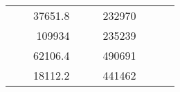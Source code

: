 \begin{table}[H]
\begin{tabular}{|ccrccrccc}
\multicolumn{1}{|c|}{\cellcolor[HTML]{FFFFC7}}                                & \multicolumn{1}{c|}{\cellcolor[HTML]{DAE8FC}}                      & \multicolumn{1}{r|}{\cellcolor[HTML]{DAE8FC}37651.8}   & \multicolumn{1}{c|}{\cellcolor[HTML]{FFFFC7}}                                & \multicolumn{1}{c|}{\cellcolor[HTML]{DAE8FC}}                       & \multicolumn{1}{r|}{\cellcolor[HTML]{DDFDFF}232970}    &                                                                              &                                                                    &                                                        \\ \cline{3-3} \cline{6-6}
\multicolumn{1}{|c|}{\cellcolor[HTML]{FFFFC7}}                                & \multicolumn{1}{c|}{\cellcolor[HTML]{DAE8FC}}                      & \multicolumn{1}{r|}{\cellcolor[HTML]{DDFDFF}109934}    & \multicolumn{1}{c|}{\cellcolor[HTML]{FFFFC7}}                                & \multicolumn{1}{c|}{\cellcolor[HTML]{DAE8FC}}                       & \multicolumn{1}{r|}{\cellcolor[HTML]{DAE8FC}235239}    &                                                                              &                                                                    &                                                        \\ \cline{3-3} \cline{6-6}
\multicolumn{1}{|c|}{\cellcolor[HTML]{FFFFC7}}                                & \multicolumn{1}{c|}{\cellcolor[HTML]{DAE8FC}}                      & \multicolumn{1}{r|}{\cellcolor[HTML]{DAE8FC}62106.4}   & \multicolumn{1}{c|}{\cellcolor[HTML]{FFFFC7}}                                & \multicolumn{1}{c|}{\cellcolor[HTML]{DAE8FC}}                       & \multicolumn{1}{r|}{\cellcolor[HTML]{DDFDFF}490691}    &                                                                              &                                                                    &                                                        \\ \cline{3-3} \cline{6-6}
\multicolumn{1}{|c|}{\cellcolor[HTML]{FFFFC7}}                                & \multicolumn{1}{c|}{\cellcolor[HTML]{DAE8FC}}                      & \multicolumn{1}{r|}{\cellcolor[HTML]{DDFDFF}18112.2}   & \multicolumn{1}{c|}{\cellcolor[HTML]{FFFFC7}}                                & \multicolumn{1}{c|}{\cellcolor[HTML]{DAE8FC}}                       & \multicolumn{1}{r|}{\cellcolor[HTML]{DAE8FC}441462}    &                                                                              &                                                                    &                                                        \\ \cline{3-3} \cline{6-6}

\end{tabular}
\end{table}

